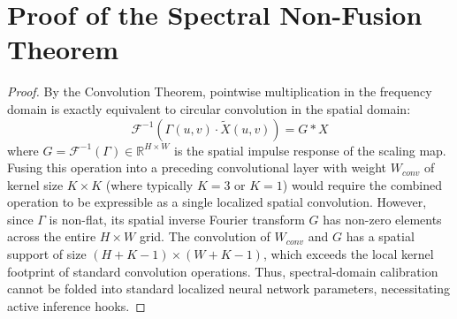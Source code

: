 \documentclass{article}
\theoremstyle{plain}
\theoremstyle{definition}
\theoremstyle{remark}
\begin{document}
\section{Proof of the Spectral Non-Fusion Theorem}
\label{app:proof_non_fusion}
\begin{proof}
  By the Convolution Theorem, pointwise multiplication in the frequency domain is exactly equivalent to circular convolution in the spatial domain:
  \begin{equation}\label{eq:conv_theorem_app}
    \mathcal{F}^{-1}(\Gamma(u, v) \cdot \tilde{X}(u, v)) = G * X
  \end{equation}
  where $G = \mathcal{F}^{-1}(\Gamma) \in \mathbb{R}^{H \times W}$ is the spatial impulse response of the scaling map. Fusing this operation into a preceding convolutional layer with weight $W_{conv}$ of kernel size $K \times K$ (where typically $K=3$ or $K=1$) would require the combined operation to be expressible as a single localized spatial convolution. However, since $\Gamma$ is non-flat, its spatial inverse Fourier transform $G$ has non-zero elements across the entire $H \times W$ grid. The convolution of $W_{conv}$ and $G$ has a spatial support of size $(H + K - 1) \times (W + K - 1)$, which exceeds the local kernel footprint of standard convolution operations. Thus, spectral-domain calibration cannot be folded into standard localized neural network parameters, necessitating active inference hooks.
\end{proof}
\end{document}
